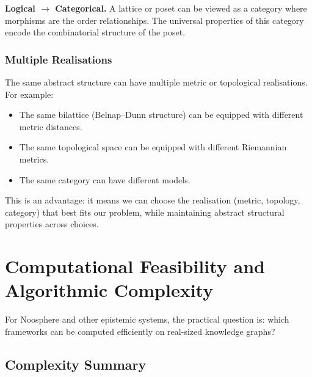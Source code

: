 \documentclass[11pt,letterpaper]{article}
\theoremstyle{definition}
\theoremstyle{remark}
\begin{document}
\textbf{Logical $\to$ Categorical.} A lattice or poset can be viewed as a category where morphisms are the order relationships. The universal properties of this category encode the combinatorial structure of the poset.

\subsubsection*{Multiple Realisations}

The same abstract structure can have multiple metric or topological realisations. For example:
\begin{itemize}
\item The same bilattice (Belnap--Dunn structure) can be equipped with different metric distances.
\item The same topological space can be equipped with different Riemannian metrics.
\item The same category can have different models.
\end{itemize}

This is an advantage: it means we can choose the realisation (metric, topology, category) that best fits our problem, while maintaining abstract structural properties across choices.

\newpage

\section{Computational Feasibility and Algorithmic Complexity}
\label{sec:computational}

For Noosphere and other epistemic systems, the practical question is: which frameworks can be computed efficiently on real-sized knowledge graphs?

\subsection{Complexity Summary}
\end{document}
